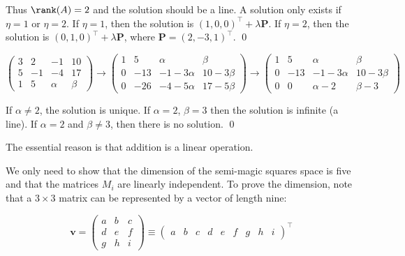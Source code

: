 \documentclass[12pt]{article}
\begin{document}
Thus $\rank(A) = 2$ and the solution should be a line. A solution only exists if $\eta = 1$ or $\eta = 2$. If $\eta = 1$, then the solution is $(1, 0, 0)^{\intercal} + \lambda \mathbf{P}$. If $\eta = 2$, then the solution is $(0, 1, 0)^{\intercal} + \lambda \mathbf{P}$, where $\mathbf{P} = (2, -3, 1)^{\intercal}$.
\qed



\begin{equation}
    \left( \begin{array}{ccc|c}
        3 & 2  & -1     & 10    \\
        5 & -1 & -4     & 17    \\
        1 & 5  & \alpha & \beta
    \end{array} \right)
    \to
    \left( \begin{array}{ccc|c}
        1 & 5   & \alpha       & \beta       \\
        0 & -13 & -1 - 3\alpha & 10 - 3\beta \\
        0 & -26 & -4 - 5\alpha & 17 - 5\beta
    \end{array} \right)
    \to
    \left( \begin{array}{ccc|c}
        1 & 5   & \alpha       & \beta       \\
        0 & -13 & -1 - 3\alpha & 10 - 3\beta \\
        0 & 0   & \alpha - 2   & \beta - 3
    \end{array} \right)
\end{equation}

If $\alpha \ne 2$, the solution is unique. If $\alpha = 2$, $\beta = 3$ then the solution is infinite (a line). If $\alpha = 2$ and $\beta \ne 3$, then there is no solution.
\qed



The essential reason is that addition is a linear operation.

We only need to show that the dimension of the semi-magic squares space is five and that the matrices $M_{i}$ are linearly independent. To prove the dimension, note that a $3 \times 3$ matrix can be represented by a vector of length nine:

\begin{equation}
    \mathbf{v} =
    \begin{pmatrix}
        a & b & c \\
        d & e & f \\
        g & h & i
    \end{pmatrix}
    \equiv
    \begin{pmatrix}
        a & b & c & d & e & f & g & h & i
    \end{pmatrix}^{\intercal}
\end{equation}
\end{document}
